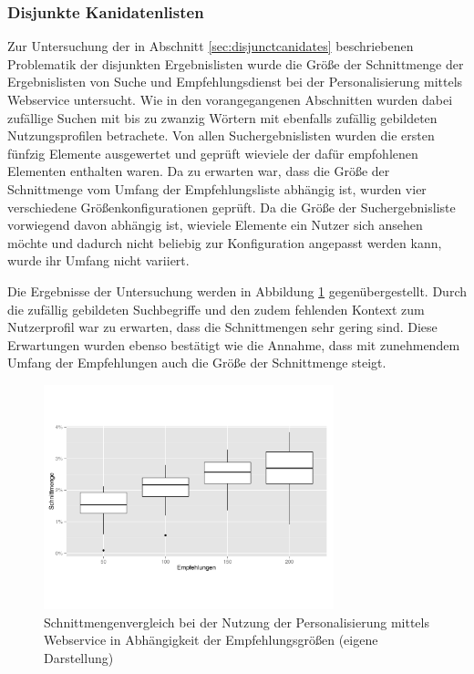 \subsubsection{Disjunkte Kanidatenlisten} \label{sec:disjunction_check}

Zur Untersuchung der in Abschnitt \ref{sec:disjunctcanidates} beschriebenen Problematik der disjunkten Ergebnislisten wurde die Größe der Schnittmenge der Ergebnislisten von Suche und Empfehlungsdienst bei der Personalisierung mittels Webservice untersucht. Wie in den vorangegangenen Abschnitten wurden dabei zufällige Suchen mit bis zu zwanzig Wörtern mit ebenfalls zufällig gebildeten Nutzungsprofilen betrachete. Von allen Suchergebnislisten wurden die ersten fünfzig Elemente ausgewertet und geprüft wieviele der dafür empfohlenen Elementen enthalten waren. Da zu erwarten war, dass die Größe der Schnittmenge vom Umfang der Empfehlungsliste abhängig ist, wurden vier verschiedene Größenkonfigurationen geprüft. Da die Größe der Suchergebnisliste vorwiegend davon abhängig ist, wieviele Elemente ein Nutzer sich ansehen möchte und dadurch nicht beliebig zur Konfiguration angepasst werden kann, wurde ihr Umfang nicht variiert.

Die Ergebnisse der Untersuchung werden in Abbildung \ref{fig:chart_disjunction} gegenübergestellt. Durch die zufällig gebildeten Suchbegriffe und den zudem fehlenden Kontext zum Nutzerprofil war zu erwarten, dass die Schnittmengen sehr gering sind. Diese Erwartungen wurden ebenso bestätigt wie die Annahme, dass mit zunehmendem Umfang der Empfehlungen auch die Größe der Schnittmenge steigt.

\begin{figure}[htb]
  \centering
    \includegraphics[width=0.75\textwidth]{Abbildungen/disjunction.pdf}
    \caption{Schnittmengenvergleich bei der Nutzung der Personalisierung mittels Webservice in Abhängigkeit der Empfehlungsgrößen {\scriptsize (eigene Darstellung)}}
    \label{fig:chart_disjunction}
\end{figure}

